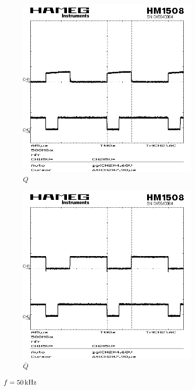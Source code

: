 \documentclass[numbers=noenddot,12pt,a4paper]{scrartcl}
\newcommand{\nicht}[1]{\overline{#1}}
\begin{document}
\begin{figure}[H]
\centering
\begin{subfigure}[b]{0.48\textwidth}
\includegraphics[width=\textwidth]{seq150khzq.png}
\caption{$Q$}
\end{subfigure}
\begin{subfigure}[b]{0.48\textwidth}
\includegraphics[width=\textwidth]{seq150khzqquer.png}
\caption{$\nicht{Q}$}
\end{subfigure}
\caption{$f=\unit[50]{kHz}$}
\end{figure}
\end{document}
